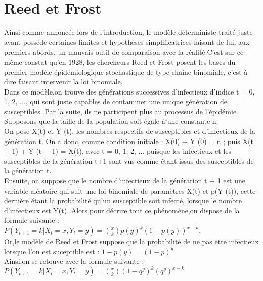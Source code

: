 \section{Reed et Frost}

Ainsi comme annoncée lors de l'introduction, le modèle déterministe traité juste avant posséde certaines limites et hypothèses simplificatrices faisant de lui, aux premiers abords, un mauvais outil de comparaison avec la réalité.C'est sur ce même constat qu'en 1928, les chercheurs Reed et Frost posent les bases du premier modèle épidémiologique stochastique de type chaîne binomiale, c'est à dire faisant intervenir la loi binomiale.\\
Dans ce modèle,on trouve des générations successives d’infectieux d’indice t = 0, 1, 2, ..., qui sont juste capables de contaminer une unique génération de susceptibles. Par la suite, ils ne participent plus au processus de l’épidémie. Supposons que la taille de la population soit égale à`une constante n.\\
On pose  X(t) et Y (t), les nombres respectifs de susceptibles et d’infectieux de la génération t.
On a donc, comme condition initiale : X(0) + Y (0) = n ; puis  X(t + 1) + Y (t + 1) = X(t), avec t = 0, 1, 2, ... puisque les infectieux et les
susceptibles de la génération t+1 sont vus comme étant issus des susceptibles de la génération t.\\
Ensuite, on suppose que le nombre d’infectieux de la génération t + 1 est une variable aléatoire qui suit une loi binomiale de paramètres X(t) et p(Y (t)), cette dernière étant la probabilité qu’un susceptible soit infecté, lorsque le nombre d'infectieux est Y(t).
Alors,pour décrire tout ce phénomène,on dispose de la formule suivante :\\
$P(Y_{t+1} = k | X_t = x, Y_t = y)= \binom{x}{k}p(y)^{k} (1-p(y))^{x-k}$.\\
Or,le modèle de Reed et Frost suppose que la probabilité de ne pas être infectieux lorsque l'on est suceptible est :
$1-p(y) = (1-p)^{y}$\\
Ainsi,on se retouve avec la formule suivante :\\
$P(Y_{t+1} = k | X_t = x, Y_t = y)= \binom{x}{k}(1 - q^{y})^{k}(q^{y})^{x - k}$\\

